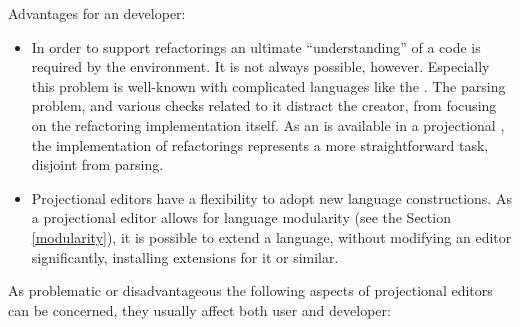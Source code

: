   
  Advantages for an  developer:
  
  \begin{itemize}
  
  \item In order to support refactorings an ultimate ``understanding'' of a code is required by the environment. 
  It is not always possible, however. Especially this problem is well-known with complicated languages like the \cpppl.
  The parsing problem, and various checks related to it distract the  creator, from focusing on the refactoring 
  implementation itself. As an  is available in a projectional , the implementation  of refactorings represents
  a more straightforward task, disjoint from parsing.
%   
%     
  
  \item Projectional editors have a flexibility to adopt new language constructions. 
  As a projectional editor allows for language modularity (see the Section \ref{modularity}), it is possible to extend a language, 
  without modifying an editor significantly, installing extensions for it or similar.
  
   
 \end{itemize}
 
 
 As problematic or disadvantageous the following aspects of projectional editors can be concerned, they usually affect both 
 user and developer:
 
